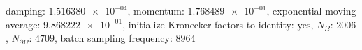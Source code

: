 damping: $\num[scientific-notation=true]{1.516380e-04}$, momentum: $\num[scientific-notation=true]{1.768489e-01}$, exponential moving average: $\num[scientific-notation=true]{9.868222e-01}$, initialize Kronecker factors to identity: $\text{yes}$, $N_{\Omega}$: $\num[scientific-notation=false]{2006}$, $N_{\partial\Omega}$: $\num[scientific-notation=false]{4709}$, batch sampling frequency: $\num[scientific-notation=false]{8964}$